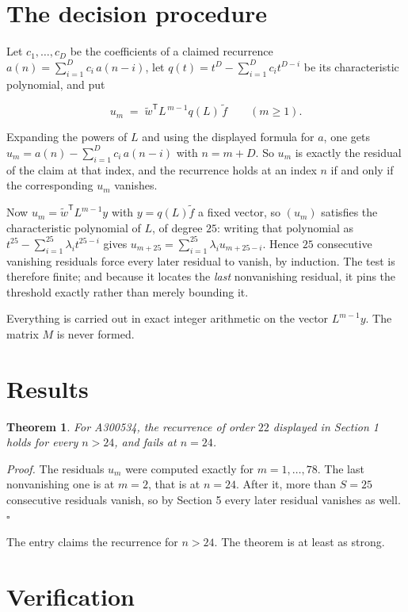 \documentclass[11pt]{article}
\newtheorem{theorem}{Theorem}
\theoremstyle{definition}
\begin{document}
\section{The decision procedure}

Let $c_1,\dots,c_D$ be the coefficients of a claimed recurrence $a(n) = \sum_{i=1}^{D} c_i\,a(n-i)$, let $q(t) = t^{D} - \sum_{i=1}^{D} c_i t^{D-i}$ be its characteristic polynomial, and put

\[u_m \;=\; \tilde w^{\mathsf T} L^{\,m-1} q(L)\,\tilde f \qquad (m \ge 1).\]

Expanding the powers of $L$ and using the displayed formula for $a$, one gets $u_m = a(n) - \sum_{i=1}^{D} c_i\,a(n-i)$ with $n = m + D$. So $u_m$ is exactly the residual of the claim at that index, and the recurrence holds at an index $n$ if and only if the corresponding $u_m$ vanishes.

Now $u_m = \tilde w^{\mathsf T} L^{m-1} y$ with $y = q(L)\tilde f$ a fixed vector, so $(u_m)$ satisfies the characteristic polynomial of $L$, of degree $25$: writing that polynomial as $t^{25} - \sum_{i=1}^{25} \lambda_i t^{25-i}$ gives $u_{m+25} = \sum_{i=1}^{25} \lambda_i u_{m+25-i}$. Hence $25$ consecutive vanishing residuals force every later residual to vanish, by induction. The test is therefore finite; and because it locates the {\itshape last} nonvanishing residual, it pins the threshold exactly rather than merely bounding it.

Everything is carried out in exact integer arithmetic on the vector $L^{m-1}y$. The matrix $M$ is never formed.

\section{Results}

\begin{theorem} For A300534, the recurrence of order $22$ displayed in Section 1 holds for every $n > 24$, and fails at $n = 24$.\end{theorem}

{\itshape Proof.} The residuals $u_m$ were computed exactly for $m = 1,\dots,78$. The last nonvanishing one is at $m = 2$, that is at $n = 24$. After it, more than $S = 25$ consecutive residuals vanish, so by Section 5 every later residual vanishes as well. $\square$

The entry claims the recurrence for $n > 24$. The theorem is at least as strong.

\section{Verification}
\end{document}
